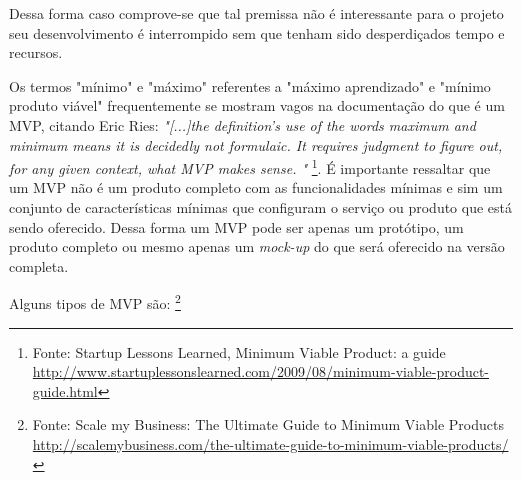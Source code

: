     \par Dessa forma caso comprove-se que tal premissa não é interessante para o projeto seu desenvolvimento é interrompido sem que tenham sido desperdiçados tempo e recursos.
    \par Os termos "mínimo" e "máximo" referentes a "máximo aprendizado" e "mínimo produto viável" frequentemente se mostram vagos na documentação do que é um MVP, citando Eric Ries: \emph{"[...]the definition's use of the words maximum and minimum means it is decidedly not formulaic. It requires judgment to figure out, for any given context, what MVP makes sense. "} \footnote{Fonte: Startup Lessons Learned, Minimum Viable Product: a guide \url{http://www.startuplessonslearned.com/2009/08/minimum-viable-product-guide.html}}. É importante ressaltar que um MVP não é um produto completo com as funcionalidades  mínimas e sim um conjunto de características mínimas que configuram o serviço ou produto que está sendo oferecido. Dessa forma um MVP pode ser apenas um protótipo, um produto completo ou mesmo apenas um \emph{mock-up} do que será oferecido na versão completa.
    \par Alguns tipos de MVP são: \footnote{ Fonte: Scale my Business: The Ultimate Guide to Minimum Viable Products  \url{http://scalemybusiness.com/the-ultimate-guide-to-minimum-viable-products/}}
